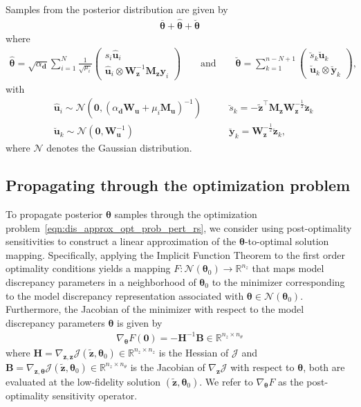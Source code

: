 \documentclass[11pt]{article}
\renewcommand{\vec}[1] {\boldsymbol{#1}}
\newcommand{\R}{\mathbb{R}}
\renewcommand{\u}{\bm{u}}
\renewcommand{\t}{\bm{\theta}}
\newcommand{\z}{\bm{z}}
\newcommand{\0}{\bm{0}}
\newcommand{\M}{\bm{M}}
\renewcommand{\H}{\bm{H}}
\newcommand{\B}{\bm{B}}
\newcommand{\W}{\bm{W}}
\newcommand{\ztilde}{\tilde{\z}}
\begin{document}
Samples from the posterior distribution are given by 
\begin{eqnarray*}
\overline{\t} + \hat{\t} + \breve{\t} 
\end{eqnarray*}
where 
\begin{eqnarray*}
\hat{\t} =  \sqrt{\alpha_{\vec{d}}} \sum\limits_{i=1}^N \frac{1}{\sqrt{\mu_i}} 
\left(
\begin{array}{c}
s_i \hat{\u}_i \\
\hat{\u}_i \otimes  \W_{\z}^{-1} \M_{\z} \vec{y}_i
\end{array}
\right)
\qquad
\text{and} 
\qquad
\breve{\t} = 
\sum\limits_{k=1}^{n-N+1}
\left(
\begin{array}{c}
\breve{s}_k \breve{\u}_k\\
\breve{\u}_k \otimes \breve{\vec{y}}_k
\end{array}
\right),
\end{eqnarray*}
with
\begin{align*}
& \hat{\u}_i \sim \mathcal N(\vec{0},\left( \alpha_{\vec{d}} \W_{\u} + \mu_i \M_{\u} \right)^{-1} ) \qquad & \breve{s}_k= -\ztilde^\top  \M_{\z} \W_{\z}^{-\frac{1}{2}} \breve{\z}_k \\
& \breve{\u}_k \sim \mathcal N(\vec{0}, \W_{\u}^{-1} )  & \breve{\vec{y}}_k = \W_{\z}^{-\frac{1}{2}} \breve{\z}_k ,
\end{align*}
where $\mathcal N$ denotes the Gaussian distribution.

\subsection*{Propagating through the optimization problem}
To propagate posterior $\t$ samples through the optimization problem~\eqref{eqn:dis_approx_opt_prob_pert_rs}, we consider using post-optimality sensitivities to construct a linear approximation of the $\t$-to-optimal solution mapping. Specifically, applying the Implicit Function Theorem to the first order optimality conditions yields a mapping $F:\mathcal N(\t_0) \to \R^{n_z}$ that maps model discrepancy parameters in a neighborhood of $\t_0$ to the minimizer corresponding to the model discrepancy representation associated with $\t \in \mathcal N(\t_0)$. Furthermore, the Jacobian of the minimizer with respect to the model discrepancy parameters $\t$ is given by
\begin{eqnarray}
\label{eqn:dis_sen_op}
\nabla_{\t} F(\vec{0}) = - \H^{-1} \B \in \R^{n_z \times n_\theta}
\end{eqnarray}
where $\H =\nabla_{\z,\z} \mathcal{J}(\tilde{\z},\t_0) \in \R^{n_z \times n_z}$ is the Hessian of $\mathcal{J}$ and $\B = \nabla_{\z,\t} \mathcal{J}(\tilde{\z},\t_0) \in \R^{n_z \times n_\theta}$ is the Jacobian of $\nabla_{\z} \mathcal{J}$ with respect to $\t$, both are evaluated at the low-fidelity solution $(\tilde{\z},\t_0)$. We refer to $\nabla_{\t} F$ as the post-optimality sensitivity operator.
\end{document}
